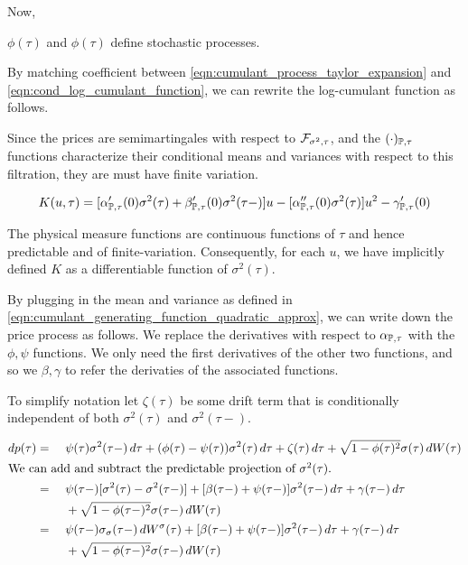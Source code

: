 \documentclass[11pt, letterpaper, twoside, final]{article}
\begin{document}
Now, 


$\phi(\tau)$ and $\phi(\tau)$ define stochastic processes.

By matching coefficient between \cref{eqn:cumulant_process_taylor_expansion} and
\cref{eqn:cond_log_cumulant_function}, we can rewrite the log-cumulant function as follows.

Since the prices are semimartingales with respect to $\mathcal{F}_{\sigma^2, \tau}$, and the $(\cdot)_{\mathbb{P},\tau}$ functions
characterize their conditional means and variances with respect to this filtration, they are must have finite
variation. 



\begin{equation}
    \label{eqn:cumulant_generating_function_quadratic_approx}
    K(u, \tau) = [\alpha_{\mathbb{P}, \tau}'(0)\sigma^2(\tau)  + \beta_{\mathbb{P}, \tau}'(0)\sigma^2(\tau-)] u - [\alpha_{\mathbb{P},
    \tau}''(0) \sigma^2(\tau)] u^2  - \gamma_{\mathbb{P}, \tau}'(0) 
\end{equation}


The physical measure functions are continuous functions of $\tau$ and hence predictable and of finite-variation.
Consequently, for each $u$, we have implicitly defined $K$ as a differentiable function of $\sigma^2(\tau)$.



By plugging in the mean and variance as defined  in \cref{eqn:cumulant_generating_function_quadratic_approx}, we
can write down the price process as follows.
We replace the derivatives with respect to $\alpha_{\mathbb{P}, \tau}$ with the $\phi, \psi$ functions.
We only need the first derivatives of the other two functions, and so we $\beta, \gamma$ to refer the derivaties of
the associated functions.

To simplify notation let $\zeta(\tau)$ be some drift term that is conditionally independent of both
$\sigma^2(\tau)$ and $\sigma^2(\tau-)$.


\begin{alignat}{2}
    \dif p(\tau) &=\ && \psi(\tau) \sigma^2(\tau-) \dif \tau + (\phi(\tau) - \psi(\tau)) \sigma^2(\tau) \dif \tau
        +  \zeta(\tau) \dif \tau + \sqrt{1 - \phi(\tau)^2} \sigma(\tau) \dif W(\tau)   \\
    \intertext{We can add and subtract the predictable projection of $\sigma^2(\tau)$.}
    &= && \psi(\tau-) [\sigma^2(\tau)  - \sigma^2(\tau-)]  + [\beta(\tau-)  + \psi(\tau-)] \sigma^2(\tau-) \dif
       \tau + \gamma(\tau-) \dif \tau \\ 
    & && + \sqrt{1 - \phi(\tau-)^2} \sigma(\tau-) \dif W(\tau)   \nonumber \\
    &= && \psi(\tau-) \sigma_{\sigma}(\tau-) \dif W^{\sigma}(\tau)  + [\beta(\tau-)  + \psi(\tau-)]
       \sigma^2(\tau-) \dif \tau + \gamma(\tau-) \dif \tau \\ 
    & && + \sqrt{1 - \phi(\tau-)^2} \sigma(\tau-) \dif W(\tau)  \nonumber 
\end{alignat}
\end{document}
